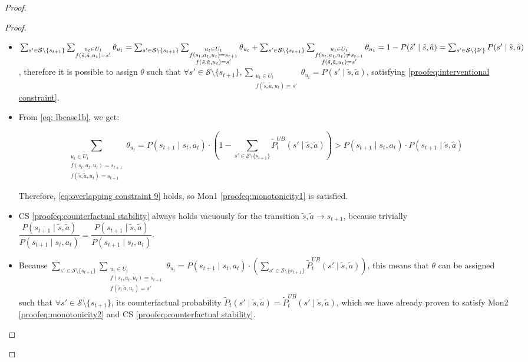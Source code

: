 \begin{proof}
\begin{proof}
\begin{itemize}
    \item $\sum_{s' \in \mathcal{S}\setminus\{s_{t+1}\}}\sum_{\substack{u_t \in U_t \\f(\tilde{s}, \tilde{a}, u_t) = s'}} \theta_{u_t} = \sum_{s' \in \mathcal{S}\setminus\{ s_{t+1}\}}\sum_{\substack{u_t \in U_t \\f(s_t, a_t, u_t) = s_{t+1} \\ f(\tilde{s}, \tilde{a}, u_t) = s'}} \theta_{u_t} + \sum_{s' \in \mathcal{S}\setminus\{s_{t+1}\}}\sum_{\substack{u_t \in U_t \\f(s_t, a_t, u_t) \neq s_{t+1} \\ f(\tilde{s}, \tilde{a}, u_t) = s'}} \theta_{u_t} \\= 1 - P(\tilde{s}' \mid \tilde{s}, \tilde{a}) = \sum_{s' \in \mathcal{S}\setminus\{\tilde{s}'\}}P(s' \mid \tilde{s}, \tilde{a})$, therefore it is possible to assign $\theta$ such that $\forall s' \in \mathcal{S}\setminus\{s_{t+1}\}, \sum_{\substack{u_t \in U_t \\ f(\tilde{s}, \tilde{a}, u_t) = s'}}{\theta_{u_t}} = P(s' \mid \tilde{s}, \tilde{a})$, satisfying \eqref{proofeq:interventional constraint}.
    
    \item From \eqref{eq: lbcase1b}, we get:
    
    \[\sum_{\substack{u_t \in U_t \\f(s_t, a_t, u_t) = s_{t+1} \\ f(\tilde{s}, \tilde{a}, u_t) = s_{t+1}}}{\theta_{u_t}} = P(s_{t+1} \mid s_t, a_t) \cdot (1 - \sum_{s' \in \mathcal{S}\setminus\{s_{t+1}\}}{\tilde{P}_{t}^{UB}(s' \mid \tilde{s}, \tilde{a})})> P(s_{t+1} \mid s_t, a_t) \cdot P(s_{t+1} \mid \tilde{s}, \tilde{a})\]
    
    Therefore, \eqref{eq:overlapping constraint 9} holds, so Mon1 \eqref{proofeq:monotonicity1} is satisfied. 

    \item CS \eqref{proofeq:counterfactual stability} always holds vacuously for the transition $\tilde{s}, \tilde{a} \rightarrow s_{t+1}$, because trivially $\dfrac{P(s_{t+1} \mid \tilde{s}, \tilde{a})}{P(s_{t+1} \mid s_t, a_t)} = \dfrac{P(s_{t+1} \mid \tilde{s}, \tilde{a})}{P(s_{t+1} \mid s_t, a_t)}$. 
    
    \item Because $\sum_{s' \in \mathcal{S}\setminus\{s_{t+1}\}}\sum_{\substack{u_t \in U_t \\f(s_t, a_t, u_t) = s_{t+1} \\ f(\tilde{s}, \tilde{a}, u_t) = s'}}{\theta_{u_t}} = P(s_{t+1} \mid s_t, a_t) \cdot (\sum_{s' \in \mathcal{S}\setminus\{s_{t+1}\}}{\tilde{P}_{t}^{UB}(s' \mid \tilde{s}, \tilde{a})})$, this means that $\theta$ can be assigned such that $\forall s' \in \mathcal{S}\setminus\{s_{t+1}\}$, its counterfactual probability $\tilde{P}_t(s' \mid \tilde{s}, \tilde{a}) = \tilde{P}_{t}^{UB}(s' \mid \tilde{s}, \tilde{a})$, which we have already proven to satisfy Mon2 \eqref{proofeq:monotonicity2} and CS \eqref{proofeq:counterfactual stability}.


\end{itemize}
\end{proof}
\end{proof}
